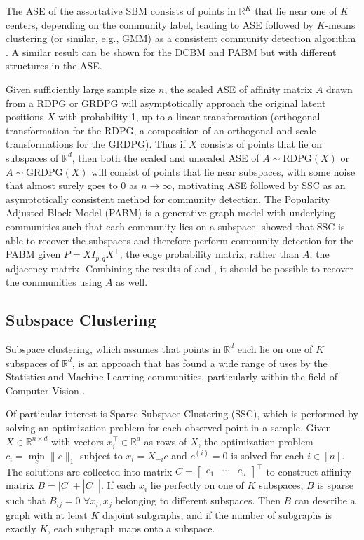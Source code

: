 \documentclass[
  11pt,
]{article}
\begin{document}
The ASE of the assortative SBM consists of points in \(\mathbb{R}^K\)
that lie near one of \(K\) centers, depending on the community label,
leading to ASE followed by \(K\)-means clustering (or similar, e.g.,
GMM) as a consistent community detection algorithm \cite{lyzinski2014}.
A similar result can be shown for the DCBM and PABM but with different
structures in the ASE.

Given sufficiently large sample size \(n\), the scaled ASE of affinity
matrix \(A\) drawn from a RDPG or GRDPG will asymptotically approach the
original latent positions \(X\) with probability 1, up to a linear
transformation (orthogonal transformation for the RDPG, a composition of
an orthogonal and scale transformations for the GRDPG). Thus if \(X\)
consists of points that lie on subspaces of \(\mathbb{R}^d\), then both
the scaled and unscaled ASE of \(A \sim \text{RDPG}(X)\) or
\(A \sim \text{GRDPG}(X)\) will consist of points that lie near
subspaces, with some noise that almost surely goes to \(0\) as
\(n \to \infty\), motivating ASE followed by SSC as an asymptotically
consistent method for community detection. The Popularity Adjusted Block
Model (PABM) \cite{307cbeb9b1be48299388437423d94bf1} is a generative
graph model with underlying communities such that each community lies on
a subspace. \citet{noroozi2019estimation} showed that SSC is able to
recover the subspaces and therefore perform community detection for the
PABM given \(P = X I_{p, q} X^\top\), the edge probability matrix,
rather than \(A\), the adjacency matrix. Combining the results of
\citeauthor{rubindelanchy2017statistical} and
\citeauthor{jmlr-v28-wang13}, it should be possible to recover the
communities using \(A\) as well.

\hypertarget{subspace-clustering}{%
\subsection{Subspace Clustering}\label{subspace-clustering}}

Subspace clustering, which assumes that points in \(\mathbb{R}^d\) each
lie on one of \(K\) subspaces of \(\mathbb{R}^d\), is an approach that
has found a wide range of uses by the Statistics and Machine Learning
communities, particularly within the field of Computer Vision
\cite{5206547}.

Of particular interest is Sparse Subspace Clustering (SSC), which is
performed by solving an optimization problem for each observed point in
a sample. Given \(X \in \mathbb{R}^{n \times d}\) with vectors
\(x_i^\top \in \mathbb{R}^d\) as rows of \(X\), the optimization problem
\(c_i = \min\limits_{c} \|c\|_1\) subject to \(x_i = X_{-i} c\) and
\(c^{(i)} = 0\) is solved for each \(i \in [n]\). The solutions are
collected into matrix
\(C = \begin{bmatrix} c_1 & \cdots & c_n \end{bmatrix}^\top\) to
construct affinity matrix \(B = |C| + |C^\top|\). If each \(x_i\) lie
perfectly on one of \(K\) subspaces, \(B\) is sparse such that
\(B_{ij} = 0\) \(\forall x_i, x_j\) belonging to different subspaces.
Then \(B\) can describe a graph with at least \(K\) disjoint subgraphs,
and if the number of subgraphs is exactly \(K\), each subgraph maps onto
a subspace.
\end{document}
